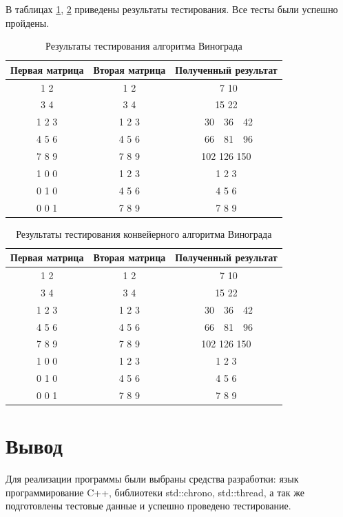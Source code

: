 В таблицах \ref{table:wtest}, \ref{table:cwtest} приведены результаты тестирования. Все тесты были успешно пройдены.

\begin{table}[H]
    \caption{Результаты тестирования алгоритма Винограда}
    \label{table:wtest}
    \centering
    \begin{tabular}{|c|c|c|}
        \hline
        Первая матрица & Вторая матрица & Полученный результат \\
        \hline
        1 2 & 1 2 & \ 7 10 \\
        3 4 & 3 4 & 15 22 \\
        \hline
        1 2 3 & 1 2 3 & \ 30\ \ 36\ \ 42 \\
        4 5 6 & 4 5 6 & \ 66\ \ 81\ \ 96 \\
        7 8 9 & 7 8 9 & 102 126 150 \\
        \hline
        1 0 0 & 1 2 3 & 1 2 3 \\
        0 1 0 & 4 5 6 & 4 5 6 \\
        0 0 1 & 7 8 9 & 7 8 9 \\
        \hline
    \end{tabular}
\end{table}

\begin{table}[H]
    \caption{Результаты тестирования конвейерного алгоритма Винограда}
    \label{table:cwtest}
    \centering
    \begin{tabular}{|c|c|c|}
        \hline
        Первая матрица & Вторая матрица & Полученный результат \\
        \hline
        1 2 & 1 2 & \ 7 10 \\
        3 4 & 3 4 & 15 22 \\
        \hline
        1 2 3 & 1 2 3 & \ 30\ \ 36\ \ 42 \\
        4 5 6 & 4 5 6 & \ 66\ \ 81\ \ 96 \\
        7 8 9 & 7 8 9 & 102 126 150 \\
        \hline
        1 0 0 & 1 2 3 & 1 2 3 \\
        0 1 0 & 4 5 6 & 4 5 6 \\
        0 0 1 & 7 8 9 & 7 8 9 \\
        \hline
    \end{tabular}
\end{table}

\section{Вывод}
Для реализации программы были выбраны средства разработки: язык программирование C++, библиотеки std::chrono, std::thread, а так же подготовлены тестовые данные и успешно проведено тестирование.

